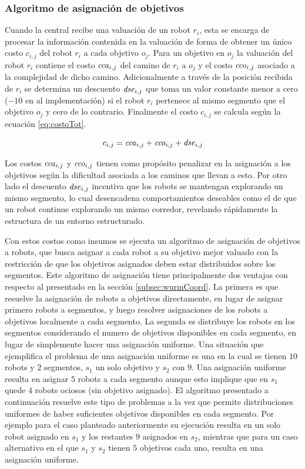 \subsubsection{Algoritmo de asignación de objetivos}
Cuando la central recibe una valuación de un robot $r_i$, esta se encarga de
procesar la información contenida en la valuación de forma de obtener un único
costo $c_{i,j}$ del robot $r_i$ a cada objetivo $o_j$. Para un objetivo en
$o_j$ la valuación del robot $r_i$ contiene el costo $\mathit{cca}_{i,j}$ del camino de
$r_i$ a $o_j$ y el costo $\mathit{cco}_{i,j}$ asociado a la complejidad de dicho camino.
Adicionalmente a través de la posición recibida de $r_i$ se determina un descuento 
$\mathit{dse}_{i,j}$ que toma un valor constante menor a cero ($-10$ en al
implementación) si el robot $r_i$ pertenece al mismo segmento que el objetivo
$o_j$ y cero de lo contrario. Finalmente el costo $c_{i,j}$ se calcula según la
ecuación \ref{eq:costoTot}.

\begin{equation} 
  c_{i,j} = \mathit{cca}_{i,j} + \mathit{cco}_{i,j} + \mathit{dse}_{i,j}
  \label{eq:costoTot}
\end{equation}

Los costos $\mathit{cca}_{i,j}$ y $\mathit{cco}_{i,j}$ tienen como propósito
penalizar en la asignación a los objetivos según la dificultad asociada a los
caminos que llevan a esto. Por otro lado el descuento $\mathit{dse}_{i,j}$
incentiva que los robots se mantengan explorando un mismo segmento, lo cual
desencadena comportamientos deseables como el de que un robot continue
explorando un mismo corredor, revelando rápidamente la estructura de un entorno
estructurado.

Con estos costos como insumos se ejecuta un algoritmo de asignación de objetivos
a robots, que busca asignar a cada robot a su objetivo mejor valuado con la
restricción de que los objetivos asignados deben estar distribuidos sobre los
segmentos. Este algoritmo de asignación tiene principalmente dos ventajas con
respecto al presentado en la sección \ref{subsec:wurmCoord}. La primera es que
resuelve la asignación de robots a objetivos directamente, en lugar de asignar
primero robots a segmentos, y luego resolver asignaciones de los robots a
objetivos localmente a cada segmento. La segunda es distribuye los robots en
los segmentos considerando el numero de objetivos disponibles en cada segmento,
en lugar de simplemente hacer una asignación uniforme. Una situación que
ejemplifica el problema de una asignación uniforme es una en la cual se tienen
$10$ robots y $2$ segmentos, $s_1$ un solo objetivo y $s_2$ con $9$. Una
asignación uniforme resulta en asignar $5$ robots a cada segmento aunque esto
implique que en $s_1$ quede $4$ robots ociosos (sin objetivo asignado). El
algoritmo presentado a continuación resuelve este tipo de problemas a la vez
que permite distribuciones uniformes de haber suficientes objetivos disponibles
en cada segmento. Por ejemplo para el caso planteado anteriormente su ejecución
resulta en un solo robot asignado en $s_1$ y los restantes $9$ asignados en
$s_2$, mientras que para un caso alternativo en el que $s_1$ y $s_2$ tienen $5$
objetivos cada uno, resulta en una asignación uniforme.

